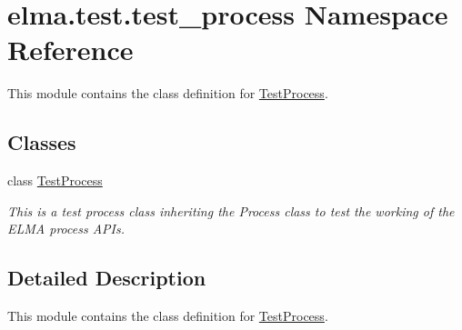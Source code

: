 \hypertarget{namespaceelma_1_1test_1_1test__process}{}\section{elma.\+test.\+test\+\_\+process Namespace Reference}
\label{namespaceelma_1_1test_1_1test__process}


This module contains the class definition for \hyperlink{classelma_1_1test_1_1test__process_1_1TestProcess}{Test\+Process}.  


\subsection*{Classes}
\begin{DoxyCompactItemize}
\item 
class \hyperlink{classelma_1_1test_1_1test__process_1_1TestProcess}{Test\+Process}
\begin{DoxyCompactList}\small\item\em This is a test process class inheriting the Process class to test the working of the E\+L\+MA process A\+P\+Is. \end{DoxyCompactList}\end{DoxyCompactItemize}


\subsection{Detailed Description}
This module contains the class definition for \hyperlink{classelma_1_1test_1_1test__process_1_1TestProcess}{Test\+Process}. 

